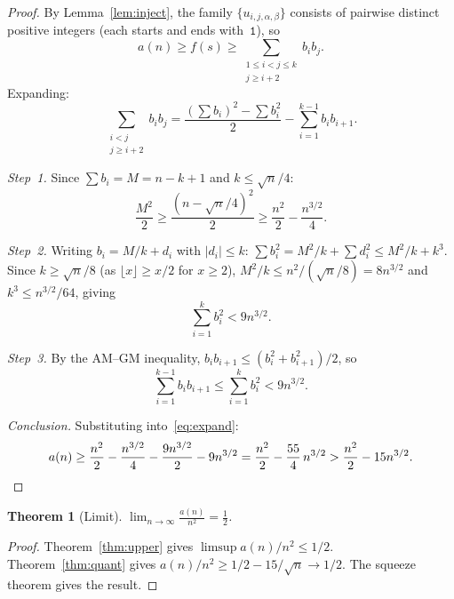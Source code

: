 \documentclass[11pt,a4paper]{article}
\theoremstyle{plain}
\newtheorem{theorem}{Theorem}[section]
\theoremstyle{definition}
\theoremstyle{remark}
\begin{document}
\begin{proof}
  By Lemma~\ref{lem:inject}, the family
  $\{u_{i,j,\alpha,\beta}\}$ consists of pairwise distinct positive
  integers (each starts and ends with~$\mathtt{1}$), so
  \begin{equation}\label{eq:f-lower}
    a(n) \ge f(s) \ge \sum_{\substack{1 \le i < j \le k \\ j \ge i+2}} b_i b_j.
  \end{equation}
  Expanding:
  \begin{equation}\label{eq:expand}
    \sum_{\substack{i < j \\ j \ge i+2}} b_i b_j
    = \frac{(\sum b_i)^2 - \sum b_i^2}{2}
      - \sum_{i=1}^{k-1} b_i b_{i+1}.
  \end{equation}

  \textit{Step~1.}  Since $\sum b_i = M = n - k + 1$ and
  $k \le \sqrt{n}/4$:
  \[
    \frac{M^2}{2} \ge \frac{(n - \sqrt{n}/4)^2}{2}
    \ge \frac{n^2}{2} - \frac{n^{3/2}}{4}.
  \]

  \textit{Step~2.}  Writing $b_i = M/k + d_i$ with $|d_i| \le k$:
  $\sum b_i^2 = M^2/k + \sum d_i^2 \le M^2/k + k^3$.
  Since $k \ge \sqrt{n}/8$ (as $\lfloor x \rfloor \ge x/2$ for
  $x \ge 2$), $M^2/k \le n^2/(\sqrt{n}/8) = 8n^{3/2}$ and
  $k^3 \le n^{3/2}/64$, giving
  \begin{equation}\label{eq:sumsq}
    \sum_{i=1}^k b_i^2 < 9n^{3/2}.
  \end{equation}

  \textit{Step~3.}  By the AM--GM inequality,
  $b_i b_{i+1} \le (b_i^2 + b_{i+1}^2)/2$, so
  \begin{equation}\label{eq:adj}
    \sum_{i=1}^{k-1} b_i b_{i+1} \le \sum_{i=1}^k b_i^2 < 9n^{3/2}.
  \end{equation}

  \textit{Conclusion.}  Substituting into~\eqref{eq:expand}:
  \[
    a(n) \ge \frac{n^2}{2} - \frac{n^{3/2}}{4}
    - \frac{9n^{3/2}}{2} - 9n^{3/2}
    = \frac{n^2}{2} - \frac{55}{4}\,n^{3/2}
    > \frac{n^2}{2} - 15n^{3/2}. \qedhere
  \]
\end{proof}

\begin{theorem}[Limit]\label{thm:limit}
  $\displaystyle\lim_{n \to \infty} \frac{a(n)}{n^2} = \frac{1}{2}$.
\end{theorem}

\begin{proof}
  Theorem~\ref{thm:upper} gives
  $\limsup a(n)/n^2 \le 1/2$.  Theorem~\ref{thm:quant} gives
  $a(n)/n^2 \ge 1/2 - 15/\sqrt{n} \to 1/2$.  The squeeze theorem
  gives the result.
\end{proof}
\end{document}
